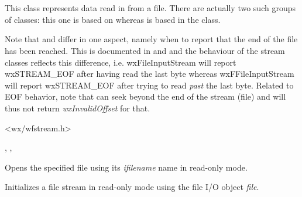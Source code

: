 \section{}\label{wxffileinputstream}

This class represents data read in from a file. There are actually
two such groups of classes: this one is based on  
whereas  is based in
the  class.

Note that  and  differ
in one aspect, namely when to report that the end of the file has been
reached. This is documented in  and 
 and the behaviour of the stream
classes reflects this difference, i.e. wxFileInputStream will report
wxSTREAM\_EOF after having read the last byte whereas wxFFileInputStream
will report wxSTREAM\_EOF after trying to read {\it past} the last byte.
Related to EOF behavior, note that  
can seek beyond the end of the stream (file) and will thus not return 
{\it wxInvalidOffset} for that.




<wx/wfstream.h>


, , 


\label{wxffileinputstreamctor}


Opens the specified file using its {\it ifilename} name in read-only mode.


Initializes a file stream in read-only mode using the file I/O object {\it file}.

